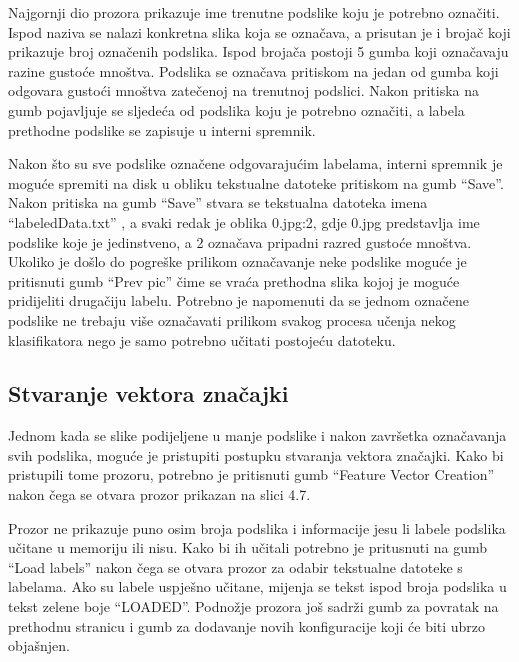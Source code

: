 \documentclass[times, utf8, zavrsni, numeric]{fer}
\begin{document}
Najgornji dio prozora prikazuje ime trenutne podslike koju je potrebno označiti.
Ispod naziva se nalazi konkretna slika koja se označava, a prisutan je i brojač
koji prikazuje broj označenih podslika. Ispod brojača postoji 5 gumba koji
označavaju razine gustoće mnoštva. Podslika se označava pritiskom na jedan
od gumba koji odgovara gustoći mnoštva zatečenoj na trenutnoj podslici. Nakon pritiska
na gumb pojavljuje se sljedeća od podslika koju je potrebno označiti, a labela
prethodne podslike se zapisuje u interni spremnik. 

\bigbreak

Nakon što su sve podslike označene
odgovarajućim labelama, interni spremnik je moguće spremiti na disk u obliku 
tekstualne datoteke pritiskom na gumb \enquote{Save}. Nakon pritiska na gumb
\enquote{Save} stvara se tekstualna datoteka imena \enquote{labeledData.txt}
, a svaki redak je oblika 0.jpg:2, gdje 0.jpg predstavlja ime podslike koje 
je jedinstveno, a 2 označava pripadni razred gustoće mnoštva. Ukoliko je 
došlo do pogreške prilikom označavanje neke podslike moguće je pritisnuti
gumb \enquote{Prev pic} čime se vraća prethodna slika kojoj je moguće pridijeliti
drugačiju labelu. Potrebno je napomenuti da se jednom označene podslike ne trebaju 
više označavati prilikom svakog procesa učenja nekog klasifikatora nego 
je samo potrebno učitati postojeću datoteku.

\subsection{Stvaranje vektora značajki}

Jednom kada se slike podijeljene u manje podslike i nakon završetka označavanja
svih podslika, moguće je pristupiti postupku stvaranja vektora značajki. 
Kako bi pristupili tome prozoru, potrebno je pritisnuti gumb \enquote{Feature Vector Creation} 
nakon čega se otvara prozor prikazan na slici 4.7.

Prozor ne prikazuje puno osim broja podslika i informacije jesu li labele
podslika učitane u memoriju ili nisu. Kako bi ih učitali potrebno je pritusnuti
na gumb \enquote{Load labels} nakon čega se otvara prozor za odabir tekstualne datoteke
s labelama. Ako su labele uspješno učitane, mijenja se tekst ispod broja
podslika u tekst zelene boje \enquote{LOADED}. Podnožje prozora još sadrži gumb
za povratak na prethodnu stranicu i gumb za dodavanje novih konfiguracije koji će biti
ubrzo objašnjen. 

\bigbreak
\end{document}
